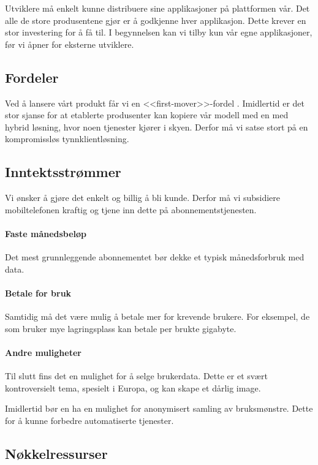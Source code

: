 Utviklere må enkelt kunne distribuere sine applikasjoner på plattformen vår.  Det alle
de store produsentene gjør er å godkjenne hver applikasjon. Dette krever en stor
investering for å få til.  I begynnelsen kan vi tilby kun vår egne applikasjoner, før vi
åpner for eksterne utviklere.

\subsection{Fordeler}

Ved å lansere vårt produkt får vi en <<first-mover>>-fordel \cite{bessant}.
Imidlertid er det stor sjanse for at etablerte produsenter kan kopiere vår
modell med en med hybrid løsning, hvor noen tjenester kjører i skyen. Derfor må
vi satse stort på en kompromissløs tynnklientløsning.

\subsection{Inntektsstrømmer}

Vi ønsker å gjøre det enkelt og billig å bli kunde. Derfor må vi subsidiere
mobiltelefonen kraftig og tjene inn dette på abonnementstjenesten.

\paragraph{Faste månedsbeløp}
Det mest grunnleggende abonnementet bør dekke et typisk månedsforbruk med data.

\paragraph{Betale for bruk}
Samtidig må det være mulig å betale mer for krevende brukere. For eksempel, de
som bruker mye lagringsplass kan betale per brukte gigabyte.

\paragraph{Andre muligheter}
Til slutt fins det en mulighet for å selge brukerdata. Dette er et svært
kontroversielt tema, spesielt i Europa, og kan skape et dårlig image.

Imidlertid bør en ha en mulighet for anonymisert samling av bruksmønstre. Dette
for å kunne forbedre automatiserte tjenester.

\subsection{Nøkkelressurser}

